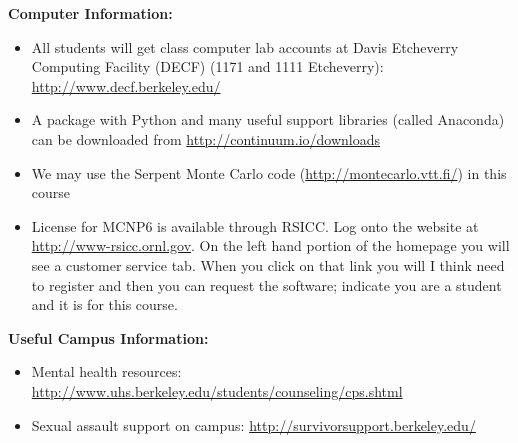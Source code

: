 \documentclass[12pt]{article}
\begin{document}
%
%

\noindent\textbf{Computer Information:} 
\begin{itemize}
\item All students will get class computer lab accounts at Davis Etcheverry Computing Facility (DECF) (1171 and 1111 Etcheverry): \href{http://www.decf.berkeley.edu/}{http://www.decf.berkeley.edu/}

\item A package with Python and many useful support libraries (called Anaconda) can be downloaded from \href{http://continuum.io/downloads}{http://continuum.io/downloads}

\item We may use the Serpent Monte Carlo code (\href{http://montecarlo.vtt.fi/}{http://montecarlo.vtt.fi/}) in this course
  
\item License for MCNP6 is available through RSICC. Log onto the website at \href{http://www-rsicc.ornl.gov}{http://www-rsicc.ornl.gov}.  On the left hand portion of the homepage you will see a customer service tab.  When you click on that link you will I think need to register and then you can request the software; indicate you are a student and it is for this course.
\end{itemize}

\vspace*{.15in}
\noindent \textbf{Useful Campus Information:} 
\begin{itemize}
  \item Mental health resources: \href{http://www.uhs.berkeley.edu/students/counseling/cps.shtml}{http://www.uhs.berkeley.edu/students/counseling/cps.shtml}
  \item Sexual assault support on campus: \href{http://survivorsupport.berkeley.edu/}{http://survivorsupport.berkeley.edu/}
\end{itemize}
\end{document}
